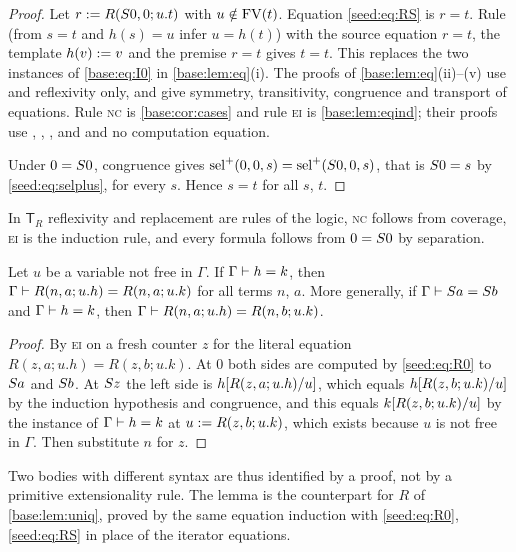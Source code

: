 \begin{proof}
Let $r\mathrel{:=} R(S 0,0;u.t)$ with $u\notin\operatorname{FV}(t)$. Equation
\eqref{seed:eq:RS} is $r=t$. Rule  (from $s=t$ and $h(s)=u$ infer
$u=h(t)$) with the source equation $r=t$, the template $h(v)\mathrel{:=} v$ and the
premise $r=t$ gives $t=t$. This replaces the two instances of
\eqref{base:eq:I0} in \cref{base:lem:eq}(i). The proofs of
\cref{base:lem:eq}(ii)--(v) use  and reflexivity only, and give
symmetry, transitivity, congruence and transport of equations. Rule
\textsc{nc} is \cref{base:cor:cases} and rule \textsc{ei} is
\cref{base:lem:eqind}; their proofs use , ,
,  and  and no computation equation.

Under $0=S 0$, congruence gives
$\operatorname{sel}^{+}(0,0,s)=\operatorname{sel}^{+}(S 0,0,s)$, that is $S 0=s$ by
\eqref{seed:eq:selplus}, for every $s$. Hence $s=t$ for all $s$, $t$.
\end{proof}

In $\mathsf{T}_R$ reflexivity and replacement are rules of the logic,
\textsc{nc} follows from coverage, \textsc{ei} is the induction rule, and
every formula follows from $0=S 0$ by separation.

\begin{lemma}\label{seed:lem:succ-unique}
Let $u$ be a variable not free in $\Gamma$. If
$\Gamma\vdash h=k$, then $\Gamma\vdash R(n,a;u.h)=R(n,a;u.k)$ for all terms
$n$, $a$. More generally, if $\Gamma\vdash S a=S b$ and
$\Gamma\vdash h=k$, then $\Gamma\vdash R(n,a;u.h)=R(n,b;u.k)$.
\end{lemma}

\begin{proof}
By \textsc{ei} on a fresh counter $z$ for the literal equation
$R(z,a;u.h)=R(z,b;u.k)$. At $0$ both sides are computed by
\eqref{seed:eq:R0} to $S a$ and $S b$. At $S z$ the left side is
$h[R(z,a;u.h)/u]$, which equals $h[R(z,b;u.k)/u]$ by the
induction hypothesis and congruence, and this equals
$k[R(z,b;u.k)/u]$ by the instance of $\Gamma\vdash h=k$ at
$u\mathrel{:=} R(z,b;u.k)$, which exists because $u$ is not free in $\Gamma$.
Then substitute $n$ for $z$.
\end{proof}

Two bodies with different syntax are thus identified by a proof, not by a
primitive extensionality rule. The lemma is the counterpart for $R$ of
\cref{base:lem:uniq}, proved by the same equation induction with
\eqref{seed:eq:R0}, \eqref{seed:eq:RS} in place of the iterator equations.

